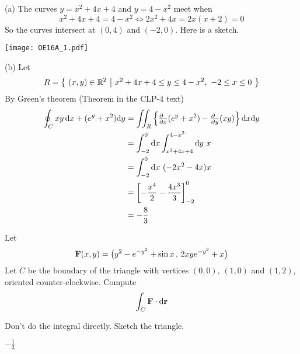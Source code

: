 \begin{solution}  (a)
The curves $y = x^2 + 4x + 4$ and $y = 4 - x^2$ meet when
\begin{equation*}
x^2 + 4x + 4 = 4 - x^2
\iff 2x^2  +4x = 2x(x+2) = 0
\end{equation*}
So the curves intersect at $(0,4)$ and  $(-2,0)$. Here is a sketch.
\begin{center}
       \texttt{[image: OE16A\_1.pdf]}
\end{center}


\noindent (b) Let
\begin{equation*}
R=\big\{ \ (x,y)\in\mathbb{R}^2\ \big|\  x^2+4x+4\le y\le  4-x^2,\ -2\le x\le 0\ \big\}
\end{equation*}
By Green's theorem (Theorem  in the CLP-4 text)
\begin{align*}
\oint_C xy\, \dee{x} + (e^y + x^2 ) \dee{y}
&=\dblInt_R \left\{
  \tfrac{\partial\hfill}{\partial x}(e^y+x^2)
  -\tfrac{\partial\hfill}{\partial y}(xy)
\right\}\dee{x}\dee{y} \\
&= \int_{-2}^0\dee{x} \int_{x^2+4x+4}^{4-x^2}\dee{y} \ x \\
&= \int_{-2}^0\dee{x}\ (-2x^2-4x) x \\
&=\left[-\frac{x^4}{2} -\frac{4x^3}{3}\right]^0_{-2} \\
&=-\frac{8}{3}
\end{align*}
\end{solution}

\begin{question}[M317 2010D] %
Let
\begin{equation*}
\mathbf{F}(x, y) = \big(y^2 - e^{-y^2} + \sin x\,,\, 2xye^{-y^2} + x\big)
\end{equation*}
Let $C$ be the boundary of the triangle with vertices $(0, 0)$, $(1, 0)$ and 
$(1, 2)$, oriented counter-clockwise. Compute
\begin{equation*}
\int_C \mathbf{F}\cdot\mathrm{d}\mathbf{r}
\end{equation*}
\end{question}

\begin{hint} 
Don't do the integral directly. Sketch the triangle.
\end{hint}

\begin{answer} 
$-\frac{1}{3}$
\end{answer}


